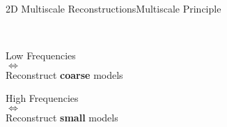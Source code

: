 \begin{frame}{2D Multiscale Reconstructions}{Multiscale Principle \cite{bunks}}
  \vspace{-0.5cm}
  \begin{multicols}{2}

    \begin{center}
    ~
    \vspace{0.8cm}

    Low Frequencies \\ $\Longleftrightarrow$ \\ Reconstruct \textbf{coarse} models

    \vspace{2.4cm}

    High Frequencies \\ $\Longleftrightarrow$ \\ Reconstruct \textbf{small} models
    \end{center}


\end{multicols}
\end{frame}
